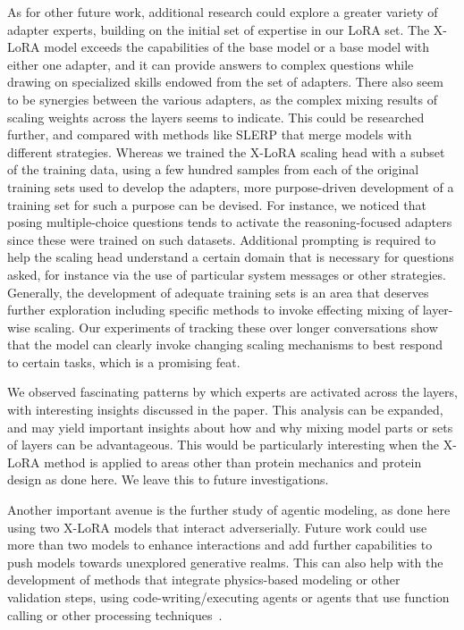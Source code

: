 As for other future work, additional research could explore a greater variety of adapter experts, building on the initial set of expertise in our LoRA set. The X-LoRA model exceeds the capabilities of the base model or a base model with either one adapter, and it can provide answers to complex questions while drawing on specialized skills endowed from the set of adapters. There also seem to be synergies between the various adapters, as the complex mixing results of scaling weights across the layers seems to indicate. This could be researched further, and compared with methods like SLERP that merge models with different strategies. Whereas we trained the X-LoRA scaling head with a subset of the training data, using a few hundred samples from each of the original training sets used to develop the adapters, more purpose-driven development of a training set for such a purpose can be devised. For instance, we noticed that posing multiple-choice questions tends to activate the reasoning-focused adapters since these were trained on such datasets. Additional prompting is required to help the scaling head understand a certain domain that is necessary for questions asked, for instance via the use of particular system messages or other strategies. Generally, the development of adequate training sets is an area that deserves further exploration including specific methods to invoke effecting mixing of layer-wise scaling. Our experiments of tracking these over longer conversations show that the model can clearly invoke changing scaling mechanisms to best respond to certain tasks, which is a promising feat. 

We observed fascinating patterns by which experts are activated across the layers, with interesting insights discussed in the paper. This analysis can be expanded, and may yield important insights about how and why mixing model parts or sets of layers can be advantageous. This would be particularly interesting when the X-LoRA method is applied to areas other than protein mechanics and protein design as done here. We leave this to future investigations. 

Another important avenue is the further study of agentic modeling, as done here using two X-LoRA models that interact adverserially. Future work could use more than two models to enhance interactions and add further capabilities to push models towards unexplored generative realms. This can also help with the development of methods that integrate physics-based modeling or other validation steps, using code-writing/executing agents or agents that use function calling or other processing techniques~\cite{Ghafarollahi2024ProtAgents:Learning}. 


